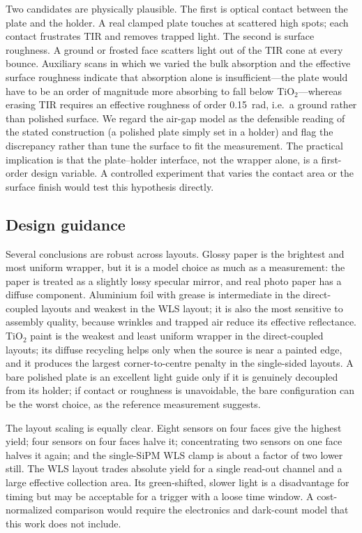 \documentclass[preprint,12pt]{elsarticle}
\begin{document}
Two candidates are physically plausible. The first is optical contact between
the plate and the holder. A real clamped plate touches at scattered high spots;
each contact frustrates TIR and removes trapped light. The second is surface
roughness. A ground or frosted face scatters light out of the TIR cone at every
bounce. Auxiliary scans in which we varied the bulk absorption and the effective
surface roughness indicate that absorption alone is insufficient---the plate
would have to be an order of magnitude more absorbing to fall below
TiO$_2$---whereas erasing TIR requires an effective roughness of order
\SI{0.15}{rad}, i.e.\ a ground rather than polished surface. We regard the
air-gap model as the defensible reading of the stated construction (a polished
plate simply set in a holder) and flag the discrepancy rather than tune the
surface to fit the measurement. The practical implication is that the
plate--holder interface, not the wrapper alone, is a first-order design
variable. A controlled experiment that varies the contact area or the surface
finish would test this hypothesis directly.

\subsection{Design guidance}

Several conclusions are robust across layouts. Glossy paper is the brightest and
most uniform wrapper, but it is a model choice as much as a measurement: the
paper is treated as a slightly lossy specular mirror, and real photo paper has a
diffuse component. Aluminium foil with grease is intermediate in the
direct-coupled layouts and weakest in the WLS layout; it is also the most
sensitive to assembly quality, because wrinkles and trapped air reduce its
effective reflectance. TiO$_2$ paint is the weakest and least uniform wrapper in
the direct-coupled layouts; its diffuse recycling helps only when the source is
near a painted edge, and it produces the largest corner-to-centre penalty in the
single-sided layouts. A bare polished plate is an excellent light guide only if
it is genuinely decoupled from its holder; if contact or roughness is
unavoidable, the bare configuration can be the worst choice, as the reference
measurement suggests.

The layout scaling is equally clear. Eight sensors on four faces give the
highest yield; four sensors on four faces halve it; concentrating two sensors on
one face halves it again; and the single-SiPM WLS clamp is about a factor of two
lower still. The WLS layout trades absolute yield for a single read-out channel
and a large effective collection area. Its green-shifted, slower light is a
disadvantage for timing but may be acceptable for a trigger with a loose time
window. A cost-normalized comparison would require the electronics and
dark-count model that this work does not include.
\end{document}

